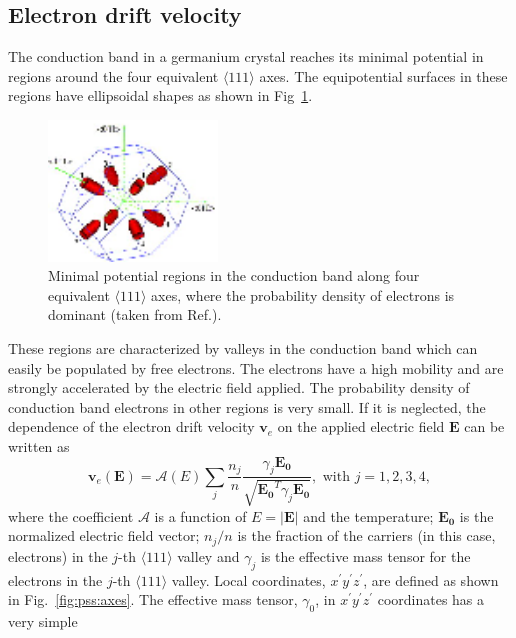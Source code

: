 \subsection{Electron drift velocity} 
\label{sec:pss:elec} 
The conduction band in a germanium crystal reaches its minimal
potential in regions around the four equivalent $\langle 111 \rangle$
axes. The equipotential surfaces in these regions have ellipsoidal
shapes as shown in Fig~\ref{fig:pss:valley}.
\begin{figure} 
\centering 
\includegraphics[width=0.4\textwidth]{valleys}   
\caption{Minimal potential regions in the conduction band along four
equivalent $\langle 111 \rangle$ axes, where the probability density
of electrons is dominant (taken from Ref.\cite{bart}).}
\label{fig:pss:valley} 
\end{figure} 
These regions are characterized by valleys in the conduction band
which can easily be populated by free electrons. The electrons have a
high mobility and are strongly accelerated by the electric field
applied.  The probability density of conduction band electrons in
other regions is very small. If it is neglected, the dependence of the
electron drift velocity $\mathbf{v}_{e}$ on the applied electric field
$\mathbf{E}$ can be written as
\begin{equation} 
\label{eq:pss:ed} 
\mathbf{v}_{e}(\mathbf{E}) = \mathcal{A}(E) \sum_{j} \frac{n_{j}}{n} 
\frac{\gamma_{j}\mathbf{E_{0}}}
{\sqrt{\mathbf{E_{0}}^{T}\gamma_{j}\mathbf{E_{0}}}}, 
\mbox{ with } j=1,2,3,4, 
\end{equation} 
where the coefficient $\mathcal{A}$ is a function of $E=|\mathbf{E}|$
and the temperature; $\mathbf{E_{0}}$ is the normalized electric field
vector; $n_{j}/n$ is the fraction of the carriers (in this case,
electrons) in the $j$-th $\langle 111 \rangle$ valley and $\gamma_{j}$
is the effective mass tensor for the electrons in the $j$-th $\langle
111 \rangle$ valley. Local coordinates,
$x^{\prime}y^{\prime}z^{\prime}$, are defined as shown in
Fig.~\ref{fig:pss:axes}. The effective mass tensor, $\gamma_{0}$, in
$x^{\prime}y^{\prime}z^{\prime}$ coordinates has a very simple
